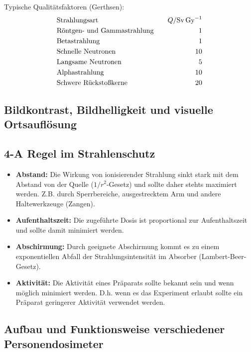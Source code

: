 \documentclass[11pt, a4paper]{article}
\numberwithin{equation}{section}
\begin{document}
Typische Qualitätsfaktoren (Gerthsen):
\begin{align*}
	&\text{Strahlungsart} \quad & Q / \si{Sv.Gy\tothe{-1}}\\
	&\text{Röntgen- und Gammastrahlung} \quad & 1 \\
	&\text{Betastrahlung} \quad & 1 \\
	&\text{Schnelle Neutronen} \quad & 10 \\
	&\text{Langsame Neutronen} \quad & 5 \\
	&\text{Alphastrahlung} \quad & 10 \\
	&\text{Schwere Rückstoßkerne} \quad & 20
\end{align*}


\subsection{Bildkontrast, Bildhelligkeit und visuelle Ortsauflösung}


\subsection{4-A Regel im Strahlenschutz}
\begin{itemize}
	\item \textbf{Abstand:}
	Die Wirkung von ionisierender Strahlung sinkt stark mit dem Abstand von der Quelle ($1/r^2$-Gesetz) und sollte daher stehts maximiert werden.
	Z.B. durch Sperrbereiche, ausgestrecktem Arm und andere Haltewerkzeuge (Zangen).
	
	
	\item \textbf{Aufenthaltszeit:}
	Die zugeführte Dosis ist proportional zur Aufenthaltszeit und sollte damit minimiert werden.
	
	
	\item \textbf{Abschirmung:}
	Durch geeignete Abschirmung kommt es zu einem exponentiellen Abfall der Strahlungsintensität im Absorber (Lambert-Beer-Gesetz).
		
	
	\item \textbf{Aktivität:}
	Die Aktivität eines Präparats sollte bekannt sein und wenn möglich minimiert werden.
	D.h. wenn es das Experiment erlaubt sollte ein Präparat geringerer Aktivität verwendet werden.
	
	
\end{itemize}


\subsection{Aufbau und Funktionsweise verschiedener Personendosimeter}
\end{document}
